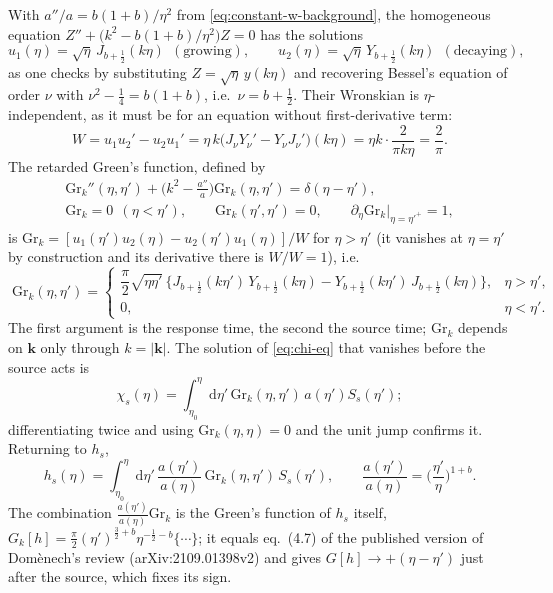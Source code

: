 \documentclass[11pt,a4paper]{article}
\newcommand{\dd}{\mathrm{d}}
\newcommand{\vk}{\mathbf{k}}
\newcommand{\Gr}{\mathrm{Gr}}
\theoremstyle{remark}
\begin{document}
With $a''/a = b(1+b)/\eta^2$ from \eqref{eq:constant-w-background}, the homogeneous equation $Z'' + \big(k^2 - b(1+b)/\eta^2\big)Z = 0$ has the solutions
\begin{equation}
u_1(\eta) = \sqrt{\eta}\,J_{b+\frac12}(k\eta)\ \ (\text{growing}),\qquad
u_2(\eta) = \sqrt{\eta}\,Y_{b+\frac12}(k\eta)\ \ (\text{decaying}),
\label{eq:chi-homogeneous}
\end{equation}
as one checks by substituting $Z = \sqrt\eta\,y(k\eta)$ and recovering Bessel's equation of order $\nu$ with $\nu^2 - \tfrac14 = b(1+b)$, i.e.\ $\nu = b+\tfrac12$. Their Wronskian is $\eta$-independent, as it must be for an equation without first-derivative term:
\begin{equation}
W = u_1u_2' - u_2u_1' = \eta\,k\big(J_\nu Y_\nu' - Y_\nu J_\nu'\big)(k\eta) = \eta k\cdot\frac{2}{\pi k\eta} = \frac{2}{\pi} .
\label{eq:wronskian}
\end{equation}
The retarded Green's function, defined by
\begin{equation}
\begin{gathered}
\Gr_k''(\eta,\eta') + \Big(k^2 - \frac{a''}{a}\Big)\Gr_k(\eta,\eta') = \delta(\eta-\eta'),\\
\Gr_k = 0\ \ (\eta<\eta'),\qquad \Gr_k(\eta',\eta') = 0,\qquad \partial_\eta\Gr_k\big|_{\eta=\eta'^+} = 1,
\end{gathered}
\label{eq:Gr-def}
\end{equation}
is $\Gr_k = [u_1(\eta')u_2(\eta) - u_2(\eta')u_1(\eta)]/W$ for $\eta>\eta'$ (it vanishes at $\eta=\eta'$ by construction and its derivative there is $W/W=1$), i.e.
\begin{equation}
\boxed{\;
\Gr_k(\eta,\eta') = \begin{cases}
\dfrac{\pi}{2}\sqrt{\eta\eta'}\,\Big\{J_{b+\frac12}(k\eta')\,Y_{b+\frac12}(k\eta) - Y_{b+\frac12}(k\eta')\,J_{b+\frac12}(k\eta)\Big\}, & \eta>\eta',\\[6pt]
0, & \eta<\eta'.
\end{cases}\;}
\label{eq:Gr}
\end{equation}
The first argument is the response time, the second the source time; $\Gr_k$ depends on $\vk$ only through $k=|\vk|$. The solution of \eqref{eq:chi-eq} that vanishes before the source acts is
\[
\chi_s(\eta) = \int_{\eta_0}^{\eta}\dd\eta'\,\Gr_k(\eta,\eta')\,a(\eta')S_s(\eta');
\]
differentiating twice and using $\Gr_k(\eta,\eta)=0$ and the unit jump confirms it. Returning to $h_s$,
\begin{equation}
h_s(\eta) = \int_{\eta_0}^{\eta}\dd\eta'\,\frac{a(\eta')}{a(\eta)}\,\Gr_k(\eta,\eta')\,S_s(\eta'),
\qquad
\frac{a(\eta')}{a(\eta)} = \Big(\frac{\eta'}{\eta}\Big)^{1+b} .
\label{eq:hs-conformal}
\end{equation}
The combination $\frac{a(\eta')}{a(\eta)}\Gr_k$ is the Green's function of $h_s$ itself, $G_k[h] = \frac{\pi}{2}(\eta')^{\frac32+b}\eta^{-\frac12-b}\{\cdots\}$; it equals eq.~(4.7) of the published version of Dom\`enech's review (arXiv:2109.01398v2) and gives $G[h]\to+(\eta-\eta')$ just after the source, which fixes its sign.
\end{document}

